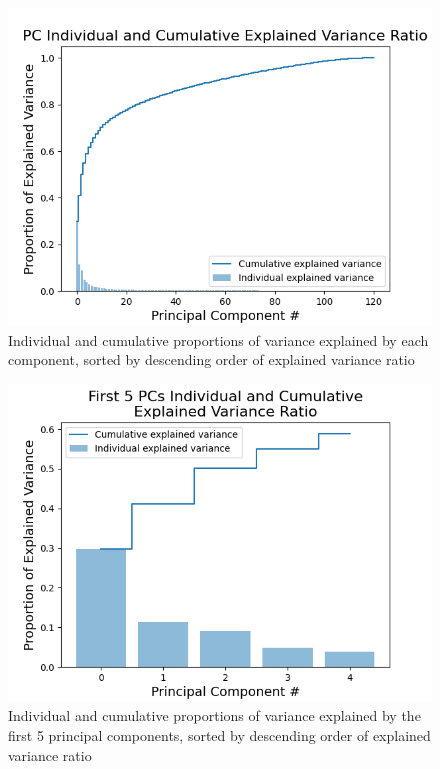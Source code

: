 \documentclass[twocolumn]{article}
\begin{document}
\begin{figure}[H]
    \centering
    \includegraphics[width=\linewidth]{figures/PCA_Explained_Variance_Curve.png}
    \caption{Individual and cumulative proportions of variance explained by each component, sorted by descending order of explained variance ratio}
    \label{fig:pc-variance}
\end{figure}

\begin{figure}[H]
    \centering
    \includegraphics[width=\linewidth]{figures/PCA_Top_5_Explained_Variance_Curve.png}
    \caption{Individual and cumulative proportions of variance explained by the first 5 principal components, sorted by descending order of explained variance ratio}
    \label{fig:pc-variance-first-5}
\end{figure}
\end{document}
